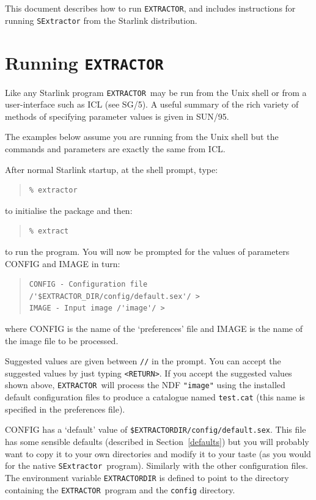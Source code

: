 \documentclass[twoside,11pt]{article}
\newcommand{\htmlref}[2]{#1}
\newcommand{\latex}[1]{#1}
\newcommand{\xref}[3]{#1}
\newcommand{\xlabel}[1]{}
\renewcommand{\_}{\texttt{\symbol{95}}}
\newcommand{\EXTRACTOR}{\texttt{EXTRACTOR}}
\newcommand{\SExtractor}{\texttt{SExtractor}}
\begin{document}
This document describes how to run \EXTRACTOR, and includes
\htmlref{instructions for running \SExtractor}{running_sextractor}
from the Starlink distribution.

\section{\xlabel{running_extractor}Running \EXTRACTOR}

Like any Starlink program \EXTRACTOR\ may be run from the
Unix shell or from a user-interface such as
\xref{ICL}{sg5}{abstract}\latex{ (see SG/5)}.
A useful summary of the rich variety of methods of specifying parameter values
is given in \xref{SUN/95}{sun95}{se_param}.

The examples below assume you are running from the Unix shell but the commands
and parameters are exactly the same from ICL.

After normal Starlink startup, at the shell prompt, type:
\begin{quote} \begin{verbatim}
% extractor
\end{verbatim} \end{quote}
to initialise the package and then:
\begin{quote} \begin{verbatim}
% extract
\end{verbatim} \end{quote}
to run the program.  You will now be prompted for the values of parameters
CONFIG and IMAGE in turn:
\begin{quote} \begin{verbatim}
CONFIG - Configuration file /'$EXTRACTOR_DIR/config/default.sex'/ >
IMAGE - Input image /'image'/ >
\end{verbatim} \end{quote}
where CONFIG is the name of the `preferences' file and IMAGE is the name of
the image file to be processed.

Suggested values are given between \texttt{//} in the prompt.  You can
accept the suggested values by just typing \verb!<RETURN>!.  If you
accept the suggested values shown above, \EXTRACTOR\ will process the
NDF \texttt{"image"} using the installed default configuration
files to produce a catalogue named \texttt{test.cat} (this name is
specified in the preferences file).

CONFIG has a `default' value of
\texttt{\$EXTRACTOR\_DIR/config/default.sex}.  This file has some
\htmlref{sensible defaults}{defaults} \latex{(described in
Section~\ref{defaults})} but you will probably want to copy it to your
own directories and modify it to your taste (as you would for the
native \SExtractor\ program).  Similarly with the other configuration
files.  The environment variable \texttt{EXTRACTOR\_DIR} is defined to
point to the directory containing the \EXTRACTOR\ program and the
\texttt{config} directory.
\end{document}
